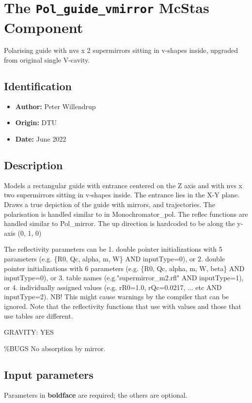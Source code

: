 \section{The \texttt{Pol\_guide\_vmirror} McStas Component}
Polarising guide with nvs x 2 supermirrors sitting in v-shapes inside,
upgraded from original single V-cavity.

\subsection*{Identification}
\begin{itemize}
  \item \textbf{Author:} Peter Willendrup
  \item \textbf{Origin:} DTU
  \item \textbf{Date:} June 2022
\end{itemize}

\subsection*{Description}
Models a rectangular guide with entrance centered on the Z axis and with nvs x two supermirrors sitting in v-shapes inside. The entrance lies in the X-Y plane. Draws a true depiction of the guide with mirrors, and trajectories. The polarisation is handled similar to in Monochromator\_pol. The reflec functions are handled similar to Pol\_mirror. The up direction is hardcoded to be along the y-axis (0, 1, 0)

The reflectivity parameters can be 1. double pointer initializations with 5 parameters (e.g. \{R0, Qc, alpha, m, W\} AND inputType=0), or 2. double pointer initializations with 6 parameters (e.g. \{R0, Qc, alpha, m, W, beta\} AND inputType=0), or 3. table names (e.g."supermirror\_m2.rfl" AND inputType=1), or 4. individually assigned values (e.g. rR0=1.0, rQc=0.0217, ... etc AND inputType=2). NB! This might cause warnings by the compiler that can be ignored. Note that the reflectivity functions that use with values and those that use tables are different.

GRAVITY: YES

\%BUGS No absorption by mirror.

\subsection*{Input parameters}
Parameters in \textbf{boldface} are required; the others are optional.

